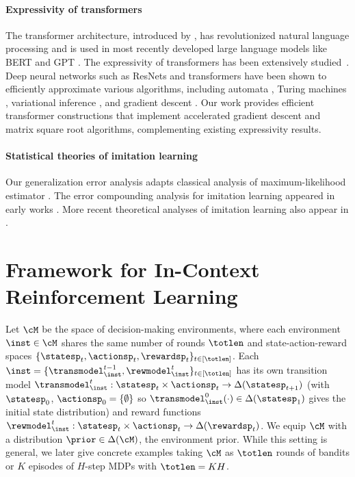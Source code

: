 \documentclass[10pt]{article}
\begin{document}
\paragraph{Expressivity of transformers} The transformer architecture, introduced by \cite{vaswani2017attention}, has revolutionized natural language processing and is used in most recently developed large language models like BERT and GPT \citep{devlin2018bert, brown2020language}. The expressivity of transformers has been extensively studied~\citep{yun2019transformers, perez2019turing, hron2020infinite,yao2021self, bhattamishra2020computational, zhang2022unveiling, liu2022transformers, wei2022statistically, fu2023can, bai2023transformers, akyurek2022learning, von2023transformers}. Deep neural networks such as ResNets and transformers have been shown to efficiently approximate various algorithms, including automata \citep{liu2022transformers}, Turing machines \citep{wei2022statistically}, variational inference \citep{mei2023deep}, and gradient descent \citep{bai2023transformers, akyurek2022learning, von2023transformers}. Our work provides efficient transformer constructions that implement accelerated gradient descent and matrix square root algorithms, complementing existing expressivity results. 





\paragraph{Statistical theories of imitation learning} Our generalization error analysis adapts classical analysis of maximum-likelihood estimator \citep{geer2000empirical}. The error compounding analysis for imitation learning appeared in early works \citep{ross2011reduction, ross2010efficient}. More recent theoretical analyses of imitation learning also appear in \cite{rajaraman2020toward, rajaraman2021provably, rashidinejad2021bridging}. 



\section{Framework for In-Context Reinforcement Learning}\label{sec:framework}


Let $\cM$ be the space of decision-making environments, where each environment $\inst \in \cM$ shares the same number of rounds $\totlen$ and state-action-reward spaces $\{ \statesp_t,  \actionsp_t, \rewardsp_t \}_{t \in [\totlen]}$. Each $\inst = \{\transmodel_\inst^{t-1}, \rewmodel_\inst^t \}_{t \in [\totlen]}$ has its own transition model $\transmodel_\inst^t: \statesp_{t} \times \actionsp_{t} \to \Delta(\statesp_{t+1})$ (with $\statesp_0$, $\actionsp_0 = \{ \emptyset \}$ so $\transmodel_\inst^0(\cdot) \in \Delta(\statesp_1)$ gives the initial state distribution) and reward functions $\rewmodel_\inst^{t}: \statesp_{t} \times \actionsp_{t} \to \Delta(\rewardsp_t)$. We equip $\cM$ with a distribution $\prior \in \Delta(\cM)$, the environment prior. While this setting is general, we later give concrete examples taking $\cM$ as $\totlen$ rounds of bandits or $K$ episodes of $H$-step MDPs with $\totlen = K H$. 
\end{document}
